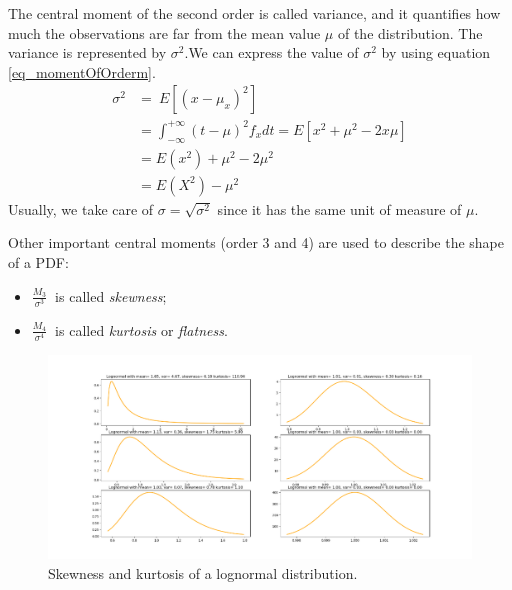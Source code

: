 The central moment of the second order is called variance, and it quantifies how much the observations are far from the mean value $\mu$ of the distribution. The variance is represented by $\sigma^2$.We can express the value of $\sigma^2$  by using equation
\ref{eq_momentOfOrderm}.
\begin{equation}
    \label{eq_deploymentVariance}
    \begin{split}
    \sigma^2 & =\ E\left[\left(x-\mu_x\right)^2\right]\\
    & =\int_{-\infty}^{+\infty}\left(t-\mu\right)^2f_xdt=E\left[x^2+\mu^2-2x\mu\right]\\
    & =E\left(x^2\right)+\mu^2-2\mu^2\\
    & =E\left(X^2\right)-\mu^2
    \end{split}
\end{equation}
Usually, we take care of $\sigma=\sqrt{\sigma^2}$ since it has the same unit of measure of $\mu$.\par

Other important central moments (order 3 and 4) are used to describe the shape of a PDF:
\begin{itemize}
    \item $\frac{M_3}{\sigma^3}\ $ is called \textit{skewness};
    \item $\frac{M_4}{\sigma^4}\ $  is called \textit{kurtosis} or \textit{flatness}.
    
\end{itemize}

\begin{figure}[hbt!]
\centering
\includegraphics[width=1\textwidth]{SectionLetsMath/elemStat_figures/fig_skewnessKurtosis.png}
\captionsetup{type=figure}
\caption{Skewness and kurtosis of a lognormal distribution.}
\label{fig_skewnessKurtosis}
\end{figure}

